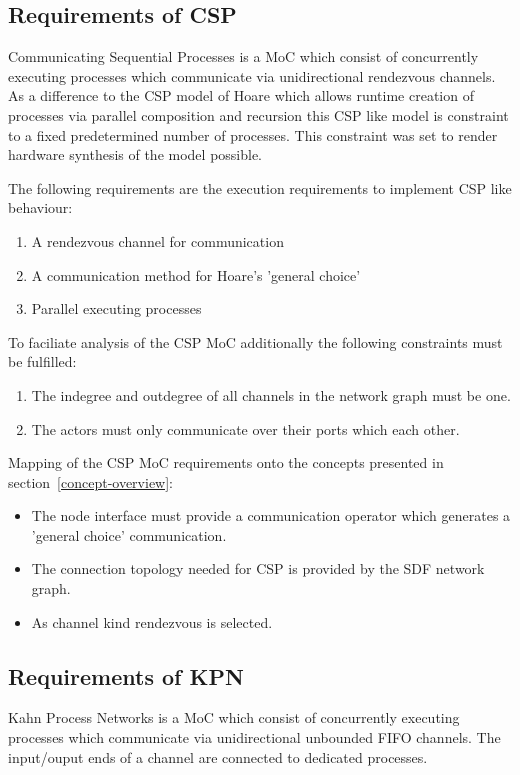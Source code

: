 \subsection{Requirements of CSP}
Communicating Sequential Processes \cite{csphoare:1985}
is a MoC which consist of concurrently executing processes
which communicate via unidirectional rendezvous channels.
As a difference to the CSP model of Hoare which allows
runtime creation of processes via parallel composition and 
recursion this CSP like model is constraint to a fixed
predetermined number of processes. This constraint was
set to render hardware synthesis of the model possible.

The following requirements are the execution requirements to
implement CSP like behaviour:

\begin{enumerate}
\item A rendezvous channel for communication
\item A communication method for Hoare's 'general choice'
\item Parallel executing processes
\end{enumerate}

To faciliate analysis of the CSP MoC additionally the following
constraints must be fulfilled:
\begin{enumerate}
\item The indegree and outdegree of all channels in the network graph must be one.
\item The actors must only communicate over their ports which each other.
\end{enumerate}

Mapping of the CSP MoC requirements onto the concepts presented in
section~\ref{concept-overview}:

\begin{itemize}

\item The node interface must provide a communication operator which
      generates a 'general choice' communication.

\item The connection topology needed for CSP is provided by the SDF network graph.

\item As channel kind rendezvous is selected.

\end{itemize}

\subsection{Requirements of KPN}
Kahn Process Networks \cite{kahn:1974}
is a MoC which consist of concurrently executing processes
which communicate via unidirectional unbounded FIFO channels.
The input/ouput ends of a channel are connected to dedicated
processes.

